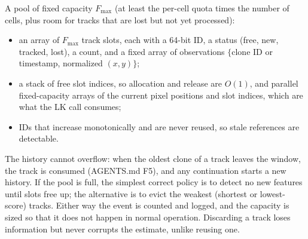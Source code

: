 \begin{solutions}
  \item A pool of fixed capacity $F_{\max}$ (at least the per-cell quota times the number of cells, plus room for tracks that are lost but not yet processed):
        \begin{itemize}
          \item an array of $F_{\max}$ track slots, each with a 64-bit ID, a status (free, new, tracked, lost), a count, and a fixed array of 
                observations $\{$clone ID or timestamp, normalized $(x, y)\}$;
          \item a stack of free slot indices, so allocation and release are $O(1)$, and parallel fixed-capacity arrays of the current pixel positions and slot
                indices, which are what the LK call consumes;
          \item IDs that increase monotonically and are never reused, so stale references are detectable.
        \end{itemize}
        The history cannot overflow: when the oldest clone of a track leaves the window, the track is consumed (AGENTS.md F5), and any continuation starts a new
        history. If the pool is full, the simplest correct policy is to detect no new features until slots free up; the alternative is to evict the weakest
        (shortest or lowest-score) tracks. Either way the event is counted and logged, and the capacity is sized so that it does not happen in normal
        operation. Discarding a track loses information but never corrupts the estimate, unlike reusing one.
\end{solutions}

